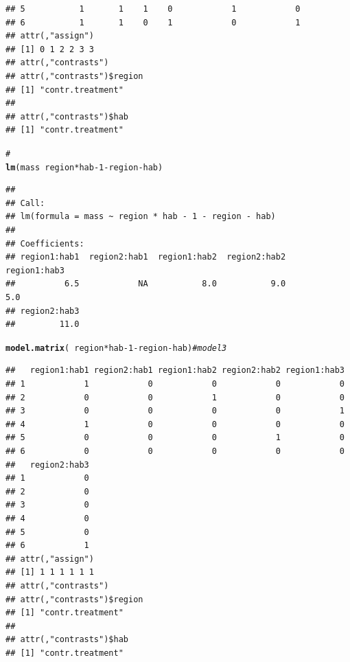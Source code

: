 \documentclass{article}\usepackage[]{graphicx}\usepackage[]{color}
\makeatletter
\newcommand{\hlnum}[1]{\textcolor[rgb]{0.686,0.059,0.569}{#1}}%
\newcommand{\hlcom}[1]{\textcolor[rgb]{0.678,0.584,0.686}{\textit{#1}}}%
\newcommand{\hlopt}[1]{\textcolor[rgb]{0,0,0}{#1}}%
\newcommand{\hlstd}[1]{\textcolor[rgb]{0.345,0.345,0.345}{#1}}%
\newcommand{\hlkwd}[1]{\textcolor[rgb]{0.737,0.353,0.396}{\textbf{#1}}}%
\newenvironment{kframe}{%
 \def\at@end@of@kframe{}%
 \ifinner\ifhmode%
  \def\at@end@of@kframe{\end{minipage}}%
  \begin{minipage}{\columnwidth}%
 \fi\fi%
 \def\FrameCommand##1{\hskip\@totalleftmargin \hskip-\fboxsep
 \colorbox{shadecolor}{##1}\hskip-\fboxsep
     \hskip-\linewidth \hskip-\@totalleftmargin \hskip\columnwidth}%
 \MakeFramed {\advance\hsize-\width
   \@totalleftmargin\z@ \linewidth\hsize
   \@setminipage}}%
 {\par\unskip\endMakeFramed%
 \at@end@of@kframe}
\newenvironment{knitrout}{}{} %
\makeatother
\begin{document}
\begin{knitrout}
\begin{kframe}
\begin{verbatim}
## 5           1       1    1    0            1            0
## 6           1       1    0    1            0            1
## attr(,"assign")
## [1] 0 1 2 2 3 3
## attr(,"contrasts")
## attr(,"contrasts")$region
## [1] "contr.treatment"
## 
## attr(,"contrasts")$hab
## [1] "contr.treatment"
\end{verbatim}
\begin{alltt}
\hlcom{# }
\hlkwd{lm}\hlstd{(mass} \hlopt{~} \hlstd{region} \hlopt{*} \hlstd{hab} \hlopt{-} \hlnum{1} \hlopt{-} \hlstd{region} \hlopt{-} \hlstd{hab)}
\end{alltt}
\begin{verbatim}
## 
## Call:
## lm(formula = mass ~ region * hab - 1 - region - hab)
## 
## Coefficients:
## region1:hab1  region2:hab1  region1:hab2  region2:hab2  region1:hab3  
##          6.5            NA           8.0           9.0           5.0  
## region2:hab3  
##         11.0
\end{verbatim}
\begin{alltt}
\hlkwd{model.matrix}\hlstd{(}\hlopt{~}\hlstd{region} \hlopt{*} \hlstd{hab} \hlopt{-} \hlnum{1} \hlopt{-} \hlstd{region} \hlopt{-} \hlstd{hab)}  \hlcom{# model 3}
\end{alltt}
\begin{verbatim}
##   region1:hab1 region2:hab1 region1:hab2 region2:hab2 region1:hab3
## 1            1            0            0            0            0
## 2            0            0            1            0            0
## 3            0            0            0            0            1
## 4            1            0            0            0            0
## 5            0            0            0            1            0
## 6            0            0            0            0            0
##   region2:hab3
## 1            0
## 2            0
## 3            0
## 4            0
## 5            0
## 6            1
## attr(,"assign")
## [1] 1 1 1 1 1 1
## attr(,"contrasts")
## attr(,"contrasts")$region
## [1] "contr.treatment"
## 
## attr(,"contrasts")$hab
## [1] "contr.treatment"
\end{verbatim}
\end{kframe}
\end{knitrout}
\end{document}
